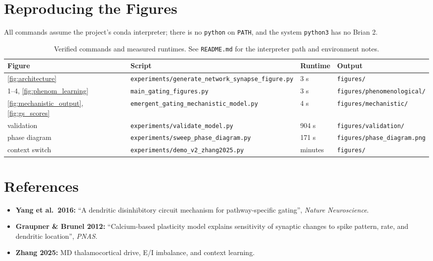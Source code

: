\documentclass[11pt,a4paper]{article}
\begin{document}
\section{Reproducing the Figures}
All commands assume the project's conda interpreter; there is no \texttt{python} on
\texttt{PATH}, and the system \texttt{python3} has no Brian 2.

\begin{table}[H]
    \centering
    \small
    \begin{tabular}{@{}llll@{}}
    \toprule
    \textbf{Figure} & \textbf{Script} & \textbf{Runtime} & \textbf{Output} \\ \midrule
    \ref{fig:architecture}
      & \texttt{experiments/generate\_network\_synapse\_figure.py} & 3 s
      & \texttt{figures/} \\
    1--4, \ref{fig:phenom_learning}
      & \texttt{main\_gating\_figures.py} & 3 s
      & \texttt{figures/phenomenological/} \\
    \ref{fig:mechanistic_output}, \ref{fig:gs_scores}
      & \texttt{emergent\_gating\_mechanistic\_model.py} & 4 s
      & \texttt{figures/mechanistic/} \\
    validation
      & \texttt{experiments/validate\_model.py} & 904 s
      & \texttt{figures/validation/} \\
    phase diagram
      & \texttt{experiments/sweep\_phase\_diagram.py} & 171 s
      & \texttt{figures/phase\_diagram.png} \\
    context switch
      & \texttt{experiments/demo\_v2\_zhang2025.py} & minutes
      & \texttt{figures/} \\ \bottomrule
    \end{tabular}
    \caption{Verified commands and measured runtimes. See \texttt{README.md} for the
    interpreter path and environment notes.}
\end{table}

\section*{References}
\begin{itemize}
    \item \textbf{Yang et al.\ 2016:} ``A dendritic disinhibitory circuit mechanism for
      pathway-specific gating'', \textit{Nature Neuroscience}.
    \item \textbf{Graupner \& Brunel 2012:} ``Calcium-based plasticity model explains
      sensitivity of synaptic changes to spike pattern, rate, and dendritic location'',
      \textit{PNAS}.
    \item \textbf{Zhang 2025:} MD thalamocortical drive, E/I imbalance, and context
      learning.
\end{itemize}
\end{document}

